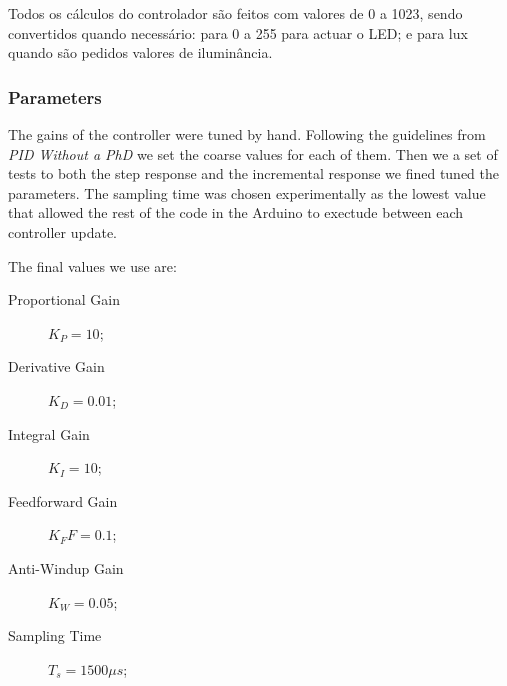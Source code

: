 Todos os cálculos do controlador são feitos com valores de 0 a 1023, sendo convertidos quando necessário: para 0 a 255 para actuar o LED; e para lux quando são pedidos valores de iluminância.

\subsubsection{Parameters}
\label{sub:Parameters}

The gains of the controller were tuned by hand.
Following the guidelines from \emph{PID Without a PhD} \cite{PIDWhitoutPhD} we set the coarse values for each of them.
Then we a set of tests to both the step response and the incremental response we fined tuned the parameters.
The sampling time was chosen experimentally as the lowest value that allowed the rest of the code in the Arduino to exectude between each controller update.

The final values we use are:
\begin{description}
    \item[Proportional Gain] $K_P = 10$;
    \item[Derivative Gain] $K_D = 0.01$;
    \item[Integral Gain] $K_I = 10$;
    \item[Feedforward Gain] $K_FF = 0.1$;
    \item[Anti-Windup Gain] $K_W = 0.05$;
    \item[Sampling Time] $T_s = 1500 \mu s$;
\end{description}
